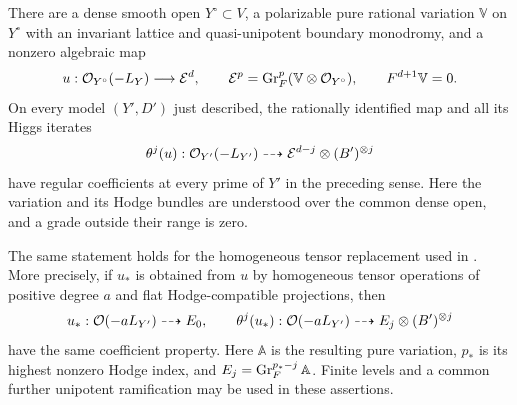 \begin{proposition}\label{prop:logarithmic-vector}
There are a dense smooth open $Y^\circ\subset V$, a polarizable pure
rational variation $\mathbb V$ on $Y^\circ$ with an invariant lattice
and quasi-unipotent boundary monodromy, and a nonzero algebraic map
\begin{equation}\label{eq:log-input-vector}
 u:\mathcal O_{Y^\circ}(-L_Y)\longrightarrow
 \mathcal E^d,
 \qquad
 \mathcal E^p=\operatorname{Gr}_F^p(\mathbb V\otimes\mathcal O_{Y^\circ}),
 \qquad F^{d+1}\mathbb V=0.
\end{equation}
On every model $(Y',D')$ just described, the rationally identified map
and all its Higgs iterates
\begin{equation}\label{eq:log-input-iterates}
 \theta^j(u):\mathcal O_{Y'}(-L_{Y'})\dashrightarrow
 \mathcal E^{d-j}\otimes(B')^{\otimes j}
\end{equation}
have regular coefficients at every prime of $Y'$ in the preceding
sense.  Here the variation and its Hodge bundles are understood over
the common dense open, and a grade outside their range is zero.

The same statement holds for the homogeneous tensor replacement used
in .  More precisely, if $u_*$ is obtained
from $u$ by homogeneous tensor operations of positive degree $a$ and
flat Hodge-compatible projections, then
\begin{equation}\label{eq:log-input-tensor}
 u_*:\mathcal O(-aL_{Y'})\dashrightarrow E_0,
 \qquad
 \theta^j(u_*):\mathcal O(-aL_{Y'})\dashrightarrow
 E_j\otimes(B')^{\otimes j}
\end{equation}
have the same coefficient property. Here $\mathbb A$ is the resulting
pure variation, $p_*$ is its highest nonzero Hodge index, and
$E_j=\operatorname{Gr}_F^{p_*-j}\mathbb A$. Finite levels and a common
further unipotent ramification may be used in these assertions.
\end{proposition}

